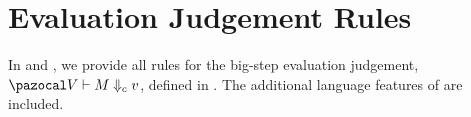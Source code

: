 \section{Evaluation Judgement Rules}
\label{app:evaluation}

In  and , we provide all rules for the big-step evaluation judgement, $\evals{\env}{M}{c}{v}$, defined in . The additional language features of \lfplplus are included.
